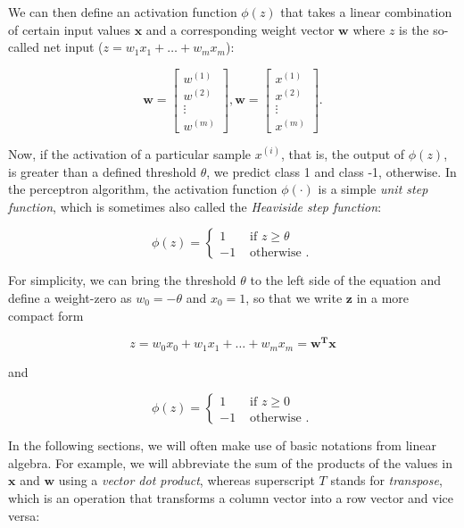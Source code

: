 \documentclass{report}
\begin{document}
We can then define an activation function $\phi(z)$ that takes a linear combination of certain
input values $\mathbf{x}$ and a corresponding weight vector $\mathbf{w}$ where $z$ is the so-called net
input ($z = w_1 x_1 + \dots + w_m x_m$):

\[
\mathbf{w} = \begin{bmatrix}
    w^{(1)}  \\
    w^{(2)}  \\
    \vdots  \\
    w^{(m)}
\end{bmatrix},
\mathbf{w} = \begin{bmatrix}
    x^{(1)}  \\
    x^{(2)}  \\
    \vdots  \\
    x^{(m)}
\end{bmatrix}.
\]

Now, if the activation of a particular sample $x^{(i)}$, that is, the output of $\phi(z)$, is greater than a defined threshold $\theta$, we predict class 1 and class -1, otherwise. In the perceptron algorithm, the activation function $\phi(\cdot)$ is a simple \textit{unit step function}, which is sometimes also called the \textit{Heaviside step function}:

\[ \phi(z) = \begin{cases} 
      1 & \text{ if } z \ge \theta \\
      -1 & \text{ otherwise }.
   \end{cases}
\]

For simplicity, we can bring the threshold $\theta$ to the left side of the equation and define a weight-zero as $w_0 = -\theta$ and $x_0=1$, so that we write $\mathbf{z}$ in a more compact form

\[
z  = w_0 x_0 + w_1 x_1 + \dots + w_m x_m = \mathbf{w^T x}
\]

and

\[ \phi(z) = \begin{cases} 
      1 & \text{ if } z \ge 0 \\
      -1 & \text{ otherwise }.
   \end{cases}
\]


In the following sections, we will often make use of basic notations from linear algebra. For example, we will abbreviate the sum of the products of the values in $\mathbf{x}$ and $\mathbf{w}$ using a \textit{vector dot product}, whereas superscript $T$ stands for \textit{transpose}, which is an operation that transforms a column vector into a row vector and vice versa:
\end{document}
